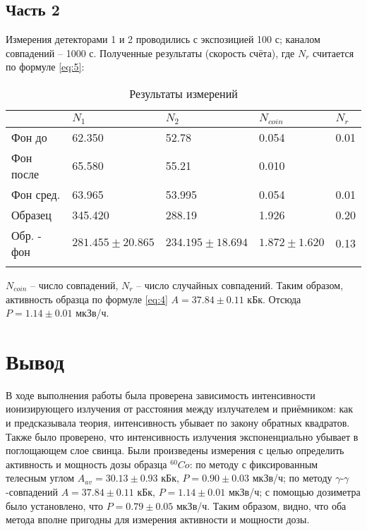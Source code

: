 \documentclass[12pt,a4paper]{article}
\begin{document}
	\subsection{Часть 2}
	Измерения детекторами 1 и 2 проводились с экспозицией 100 с; каналом совпадений -- 1000 с. Полученные результаты (скорость счёта), где $N_r$ считается по формуле \ref{eq:5}:
	{\footnotesize
	\begin{longtable}{| l | l | l | l | l |}
					&	$N_1$					&	$N_2$					&	$N_{coin}$				&	$N_r$	\\	
		\hline
		Фон до		&	62.350					&	52.78					&	0.054					&	0.01	\\
		Фон после	&	65.580					&	55.21					&	0.010					&			\\
		Фон сред.	&	63.965					&	53.995					&	0.054					&	0.01	\\
		Образец	&	345.420				&	288.19					&	1.926					&	0.20	\\
		Обр. - фон	&	$281.455\pm20.865$	&	$234.195\pm18.694$	&	$1.872\pm1.620$		&	0.13	\\
		\hline
	\caption{Результаты измерений} \label{tab:tab4}
	\end{longtable}}
	$N_{coin}$ -- число совпадений, $N_r$ -- число случайных совпадений. Таким образом, активность образца по формуле \ref{eq:4} $A = 37.84\pm0.11$ кБк. Отсюда $P = 1.14\pm0.01$ мкЗв/ч.
	\section{Вывод}
	В ходе выполнения работы была проверена зависимость интенсивности ионизирующего излучения от расстояния между излучателем и приёмником: как и предсказывала теория, интенсивность убывает по закону обратных квадратов. Также было проверено, что интенсивность излучения экспоненциально убывает в поглощающем слое свинца. Были произведены измерения с целью определить активность и мощность дозы образца ${}^{60}Co$: по методу с фиксированным телесным углом $A_{av} = 30.13\pm0.93$ кБк,  $P = 0.90\pm0.03$ мкЗв/ч; по методу $\gamma$-$\gamma$-совпадений $A = 37.84\pm0.11$ кБк, $P = 1.14\pm0.01$ мкЗв/ч; с помощью дозиметра было установлено, что $P = 0.79\pm0.05$ мкЗв/ч. Таким образом, видно, что оба метода вполне пригодны для измерения активности и мощности дозы.
	
\end{document}
